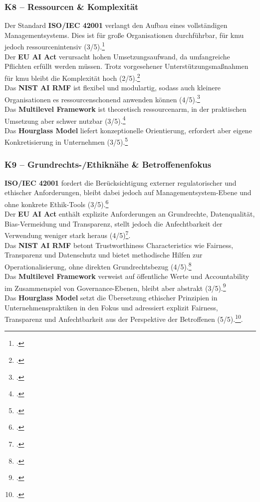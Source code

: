\subsubsection{K8 – Ressourcen \& Komplexität}
Der Standard \textbf{ISO/IEC 42001} verlangt den Aufbau eines vollständigen Managementsystems.
Dies ist für große Organisationen durchführbar, für \ac{kmu} jedoch ressourcenintensiv (3/5).\footcite[][Kap.~4--10]{isoISOIEC42001}
\\
Der \textbf{EU AI Act} verursacht hohen Umsetzungsaufwand, da umfangreiche Pflichten erfüllt werden müssen. 
Trotz vorgesehener Unterstützungsmaßnahmen für \ac{kmu} bleibt die Komplexität hoch (2/5).\footcite[][S.~6--7]{europeanparliamentaryresearchserviceArtificialIntelligenceAct2024}
\\
Das \textbf{NIST AI RMF} ist flexibel und modulartig, sodass auch kleinere Organisationen es ressourcenschonend anwenden können (4/5).\footcite[][S.~6--9]{nationalinstituteofstandardsandtechnologyAIRiskManagement2021}
\\
Das \textbf{Multilevel Framework} ist theoretisch ressourcenarm, in der praktischen Umsetzung aber schwer nutzbar (3/5).\footcite[][S.~7--10]{choungMultilevelFrameworkAI2023}
\\
Das \textbf{Hourglass Model} liefert konzeptionelle Orientierung, erfordert aber eigene Konkretisierung in Unternehmen (3/5).\footcite[][S.~4--6]{mantymakiPDFPuttingAI2025}


\subsubsection{K9 – Grundrechts-/Ethiknähe \& Betroffenenfokus}
\textbf{ISO/IEC 42001} fordert die Berücksichtigung externer regulatorischer und ethischer Anforderungen, bleibt dabei jedoch auf Managementsystem-Ebene und ohne konkrete Ethik-Tools (3/5).\footcite[][Kap.~4.1]{isoISOIEC42001}
\\
Der \textbf{EU AI Act} enthält explizite Anforderungen an Grundrechte, Datenqualität, Bias-Vermeidung und Transparenz, stellt jedoch die Anfechtbarkeit der Verwendung weniger stark heraus (4/5)\footcite[][S.~2--5]{europeanparliamentaryresearchserviceArtificialIntelligenceAct2024}.  
\\
Das \textbf{NIST AI RMF} betont \glqq{}Trustworthiness Characteristics\grqq{} wie Fairness, Transparenz und Datenschutz und bietet methodische Hilfen zur Operationalisierung, ohne direkten Grundrechtsbezug (4/5).\footcite[][S.~9--12]{nationalinstituteofstandardsandtechnologyAIRiskManagement2021}
\\
Das \textbf{Multilevel Framework} verweist auf öffentliche Werte und Accountability im Zusammenspiel von Governance-Ebenen, bleibt aber abstrakt (3/5).\footcite[][S.~8--11]{choungMultilevelFrameworkAI2023}
\\
Das \textbf{Hourglass Model} setzt die Übersetzung ethischer Prinzipien in Unternehmenspraktiken in den Fokus und adressiert explizit Fairness, Transparenz und Anfechtbarkeit aus der Perspektive der Betroffenen (5/5).\footcite[][S.~3--6]{mantymakiPDFPuttingAI2025}.  

